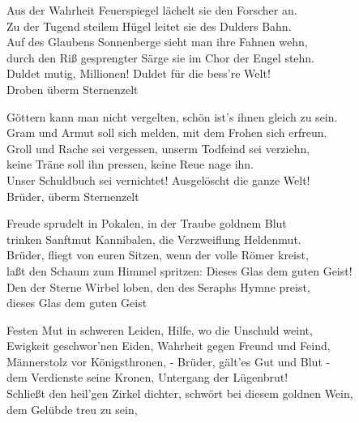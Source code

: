 \thestrophe Aus der Wahrheit Feuerspiegel lächelt sie den Forscher an. \\
Zu der Tugend steilem Hügel leitet sie des Dulders Bahn. \\
Auf des Glaubens Sonnenberge sieht man ihre Fahnen wehn, \\
durch den Riß gesprengter Särge sie im Chor der Engel stehn. \\
Duldet mutig, Millionen! Duldet für die bess're Welt! \\
Droben überm Sternenzelt

\thestrophe Göttern kann man nicht vergelten, schön ist's ihnen gleich zu sein. \\
Gram und Armut soll sich melden, mit dem Frohen sich erfreun. \\
Groll und Rache sei vergessen, unserm Todfeind sei verziehn, \\
keine Träne soll ihn pressen, keine Reue nage ihn. \\
Unser Schuldbuch sei vernichtet! Ausgelöscht die ganze Welt! \\
Brüder, überm Sternenzelt

\thestrophe Freude sprudelt in Pokalen, in der Traube goldnem Blut \\
trinken Sanftmut Kannibalen, die Verzweiflung Heldenmut. \\
Brüder, fliegt von euren Sitzen, wenn der volle Römer kreist, \\
laßt den Schaum zum Himmel spritzen: Dieses Glas dem guten Geist! \\
Den der Sterne Wirbel loben, den des Seraphs Hymne preist, \\
dieses Glas dem guten Geist

\thestrophe Festen Mut in schweren Leiden, Hilfe, wo die Unschuld weint, \\
Ewigkeit geschwor'nen Eiden, Wahrheit gegen Freund und Feind, \\
Männerstolz vor Königsthronen, - Brüder, gält'es Gut und Blut - \\
dem Verdienste seine Kronen, Untergang der Lügenbrut! \\
Schließt den heil'gen Zirkel dichter, schwört bei diesem goldnen Wein, \\
dem Gelübde treu zu sein, 